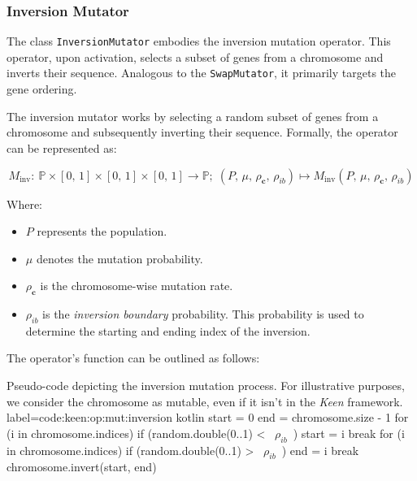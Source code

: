 
\subsubsection{Inversion Mutator}
\label{sec:keen:op:mut:inversion}
  The class \texttt{InversionMutator} embodies the inversion mutation operator. 
  This operator, upon activation, selects a subset of genes from a chromosome 
  and inverts their sequence. Analogous to the \texttt{SwapMutator}, it 
  primarily targets the gene ordering.

  \begin{definition}
  \label{def:keen:op:mut:inversion}
    The inversion mutator works by selecting a random subset of genes from a 
    chromosome and subsequently inverting their sequence. Formally, the 
    operator can be represented as:

    \begin{equation}
      M_\mathrm{inv} :\: 
        \mathbb{P} \times [0,\, 1] \times [0,\, 1] \times [0,\, 1] 
          \to \mathbb{P};\;
      (P,\, \mu,\, \rho_\mathbf{c},\, \rho_{ib}) 
        \mapsto M_\mathrm{inv}(P,\, \mu,\, \rho_\mathbf{c},\, \rho_{ib})
    \end{equation}

    Where:
    \begin{itemize}
        \item \(P\) represents the population.
        \item \(\mu\) denotes the mutation probability.
        \item \(\rho_\mathbf{c}\) is the chromosome-wise mutation rate.
        \item \(\rho_{ib}\) is the \textit{inversion boundary} probability. 
          This probability is used to determine the starting and ending index 
          of the inversion.
    \end{itemize}
  \end{definition}

  The operator's function can be outlined as follows:

  \begin{code}{
      Pseudo-code depicting the inversion mutation process. For illustrative
      purposes, we consider the chromosome as mutable, even if it isn't in the
      \textit{Keen} framework.
    }{
      label=code:keen:op:mut:inversion
    }{kotlin}
      start = 0
      end = chromosome.size - 1
      for (i in chromosome.indices) {
          if (random.double(0..1) < ~$\rho_{ib}$~) {
              start = i
              break
          }
      }
      for (i in chromosome.indices) {
          if (random.double(0..1) > ~$\rho_{ib}$~) {
              end = i
              break
          }
      }
      chromosome.invert(start, end)
  \end{code}

